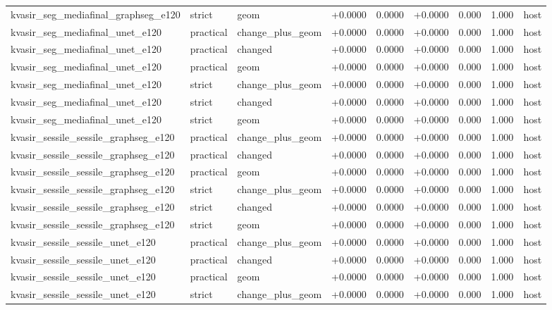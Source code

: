 \begin{table}[t]
\begin{tabular}{lllllllll}
kvasir\_seg\_mediafinal\_graphseg\_e120 & strict & geom & +0.0000 & 0.0000 & +0.0000 & 0.000 & 1.000 & host \\
kvasir\_seg\_mediafinal\_unet\_e120 & practical & change\_plus\_geom & +0.0000 & 0.0000 & +0.0000 & 0.000 & 1.000 & host \\
kvasir\_seg\_mediafinal\_unet\_e120 & practical & changed & +0.0000 & 0.0000 & +0.0000 & 0.000 & 1.000 & host \\
kvasir\_seg\_mediafinal\_unet\_e120 & practical & geom & +0.0000 & 0.0000 & +0.0000 & 0.000 & 1.000 & host \\
kvasir\_seg\_mediafinal\_unet\_e120 & strict & change\_plus\_geom & +0.0000 & 0.0000 & +0.0000 & 0.000 & 1.000 & host \\
kvasir\_seg\_mediafinal\_unet\_e120 & strict & changed & +0.0000 & 0.0000 & +0.0000 & 0.000 & 1.000 & host \\
kvasir\_seg\_mediafinal\_unet\_e120 & strict & geom & +0.0000 & 0.0000 & +0.0000 & 0.000 & 1.000 & host \\
kvasir\_sessile\_sessile\_graphseg\_e120 & practical & change\_plus\_geom & +0.0000 & 0.0000 & +0.0000 & 0.000 & 1.000 & host \\
kvasir\_sessile\_sessile\_graphseg\_e120 & practical & changed & +0.0000 & 0.0000 & +0.0000 & 0.000 & 1.000 & host \\
kvasir\_sessile\_sessile\_graphseg\_e120 & practical & geom & +0.0000 & 0.0000 & +0.0000 & 0.000 & 1.000 & host \\
kvasir\_sessile\_sessile\_graphseg\_e120 & strict & change\_plus\_geom & +0.0000 & 0.0000 & +0.0000 & 0.000 & 1.000 & host \\
kvasir\_sessile\_sessile\_graphseg\_e120 & strict & changed & +0.0000 & 0.0000 & +0.0000 & 0.000 & 1.000 & host \\
kvasir\_sessile\_sessile\_graphseg\_e120 & strict & geom & +0.0000 & 0.0000 & +0.0000 & 0.000 & 1.000 & host \\
kvasir\_sessile\_sessile\_unet\_e120 & practical & change\_plus\_geom & +0.0000 & 0.0000 & +0.0000 & 0.000 & 1.000 & host \\
kvasir\_sessile\_sessile\_unet\_e120 & practical & changed & +0.0000 & 0.0000 & +0.0000 & 0.000 & 1.000 & host \\
kvasir\_sessile\_sessile\_unet\_e120 & practical & geom & +0.0000 & 0.0000 & +0.0000 & 0.000 & 1.000 & host \\
kvasir\_sessile\_sessile\_unet\_e120 & strict & change\_plus\_geom & +0.0000 & 0.0000 & +0.0000 & 0.000 & 1.000 & host \\

\end{tabular}
\end{table}
